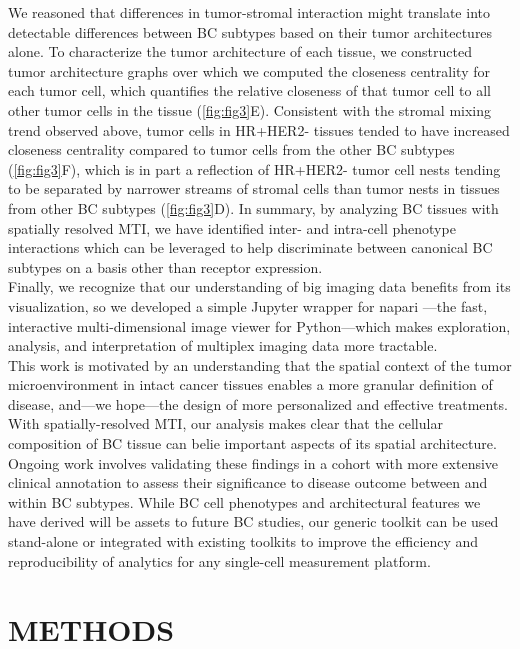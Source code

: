 \documentclass[preprint,review,3p,12pt]{elsarticle}
\begin{document}
We reasoned that differences in tumor-stromal interaction might translate into detectable differences between BC subtypes based on their tumor architectures alone. To characterize the tumor architecture of each tissue, we constructed tumor architecture graphs over which we computed the closeness centrality for each tumor cell, which quantifies the relative closeness of that tumor cell to all other tumor cells in the tissue (\autoref{fig:fig3}E). Consistent with the stromal mixing trend observed above, tumor cells in HR+HER2- tissues tended to have increased closeness centrality compared to tumor cells from the other BC subtypes (\autoref{fig:fig3}F), which is in part a reflection of HR+HER2- tumor cell nests tending to be separated by narrower streams of stromal cells than tumor nests in tissues from other BC subtypes (\autoref{fig:fig3}D). In summary, by analyzing BC tissues with spatially resolved MTI, we have identified inter- and intra-cell phenotype interactions which can be leveraged to help discriminate between canonical BC subtypes on a basis other than receptor expression. \\

Finally, we recognize that our understanding of big imaging data benefits from its visualization, so we developed a simple Jupyter wrapper for napari \cite{napari_0_3_0}—the fast, interactive multi-dimensional image viewer for Python—which makes exploration, analysis, and interpretation of multiplex imaging data more tractable. \\

This work is motivated by an understanding that the spatial context of the tumor microenvironment in intact cancer tissues enables a more granular definition of disease, and—we hope—the design of more personalized and effective treatments. With spatially-resolved MTI, our analysis makes clear that the cellular composition of BC tissue can belie important aspects of its spatial architecture. Ongoing work involves validating these findings in a cohort with more extensive clinical annotation to assess their significance to disease outcome between and within BC subtypes. While BC cell phenotypes and architectural features we have derived will be assets to future BC studies, our generic toolkit can be used stand-alone or integrated with existing toolkits \cite{histocat2017} to improve the efficiency and reproducibility of analytics for any single-cell measurement platform.

\section{METHODS}
\end{document}
